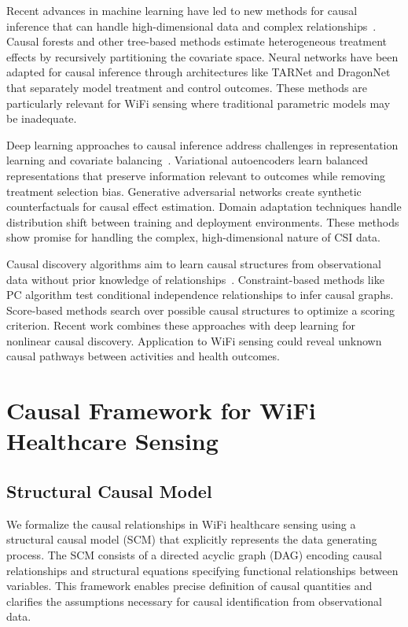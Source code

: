 \documentclass[journal]{IEEEtran}
\begin{document}
Recent advances in machine learning have led to new methods for causal inference that can handle high-dimensional data and complex relationships~\cite{ml2023causal}. Causal forests and other tree-based methods estimate heterogeneous treatment effects by recursively partitioning the covariate space. Neural networks have been adapted for causal inference through architectures like TARNet and DragonNet that separately model treatment and control outcomes. These methods are particularly relevant for WiFi sensing where traditional parametric models may be inadequate.

Deep learning approaches to causal inference address challenges in representation learning and covariate balancing~\cite{deep2022causal}. Variational autoencoders learn balanced representations that preserve information relevant to outcomes while removing treatment selection bias. Generative adversarial networks create synthetic counterfactuals for causal effect estimation. Domain adaptation techniques handle distribution shift between training and deployment environments. These methods show promise for handling the complex, high-dimensional nature of CSI data.

Causal discovery algorithms aim to learn causal structures from observational data without prior knowledge of relationships~\cite{discovery2023}. Constraint-based methods like PC algorithm test conditional independence relationships to infer causal graphs. Score-based methods search over possible causal structures to optimize a scoring criterion. Recent work combines these approaches with deep learning for nonlinear causal discovery. Application to WiFi sensing could reveal unknown causal pathways between activities and health outcomes.

\section{Causal Framework for WiFi Healthcare Sensing}

\subsection{Structural Causal Model}

We formalize the causal relationships in WiFi healthcare sensing using a structural causal model (SCM) that explicitly represents the data generating process. The SCM consists of a directed acyclic graph (DAG) encoding causal relationships and structural equations specifying functional relationships between variables. This framework enables precise definition of causal quantities and clarifies the assumptions necessary for causal identification from observational data.
\end{document}
